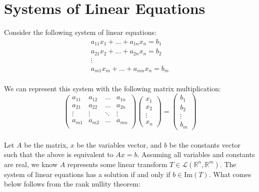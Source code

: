 \documentclass{article}
\begin{document}
\section{Systems of Linear Equations}
Consider the following system of linear equations:
\begin{gather*}
	a_{11}x_1+\dots+a_{1n}x_n=b_1 \\
	a_{21}x_2+\dots+a_{2n}x_n=b_2 \\
	\vdots \\
	a_{m1}x_m+\dots+a_{mn}x_n=b_m
\end{gather*}
\\
We can represent this system with the following matrix multiplication:
\begin{equation*}
	\left(
		\begin{matrix}
			a_{11} & a_{12} & \dots & a_{1n} \\
			a_{21} & a_{22} & \dots & a_{2n} \\
			\vdots & \vdots & \ddots & \vdots \\
			a_{m1} & a_{m2} & \dots & a_{mn} \\
		\end{matrix}
	\right)
	\left(
		\begin{matrix}
			x_1 \\
			x_2 \\
			\vdots \\
			x_n
		\end{matrix}
	\right)
	= \left(
		\begin{matrix}
			b_1 \\
			b_2 \\
			\vdots \\
			b_m
		\end{matrix}
	\right)
\end{equation*}
\\
Let $A$ be the matrix, $x$ be the variables vector, and $b$ be the constants vector such that the above is equivalent to $Ax=b$. Assuming all variables and constants are real, we know $A$ represents some linear transform $T\in \mathcal{L}(\mathbb{R}^n,\mathbb{R}^m)$. The system of linear equations has a solution if and only if $b\in \text{Im}(T)$. What comes below follows from the rank nullity theorem:
\end{document}
